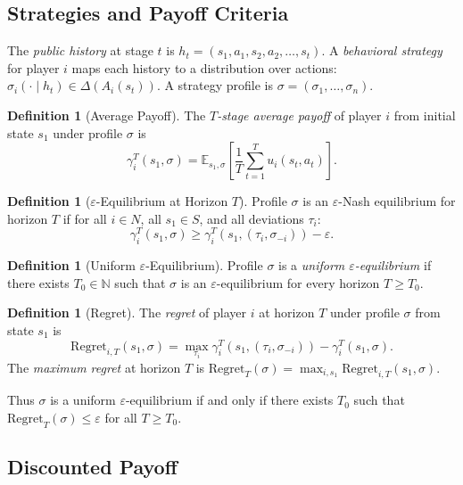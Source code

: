 \documentclass[11pt,a4paper]{article}
\theoremstyle{definition}
\newtheorem{definition}[theorem]{Definition}
\newcommand{\N}{\mathbb{N}}
\newcommand{\E}{\mathbb{E}}
\newcommand{\eps}{\varepsilon}
\newcommand{\Regret}{\mathrm{Regret}}
\begin{document}
\subsection{Strategies and Payoff Criteria}

The \emph{public history} at stage $t$ is $h_t = (s_1, a_1, s_2, a_2, \ldots, s_t)$.
A \emph{behavioral strategy} for player $i$ maps each history to a distribution over actions: $\sigma_i(\cdot \mid h_t) \in \Delta(A_i(s_t))$.
A strategy profile is $\sigma = (\sigma_1, \ldots, \sigma_n)$.

\begin{definition}[Average Payoff]
The \emph{$T$-stage average payoff} of player $i$ from initial state $s_1$ under profile $\sigma$ is
\[
\gamma_i^T(s_1, \sigma) = \E_{s_1, \sigma}\!\left[\frac{1}{T}\sum_{t=1}^{T} u_i(s_t, a_t)\right].
\]
\end{definition}

\begin{definition}[$\eps$-Equilibrium at Horizon $T$]
Profile $\sigma$ is an $\eps$-Nash equilibrium for horizon $T$ if for all $i \in N$, all $s_1 \in S$, and all deviations $\tau_i$:
\[
\gamma_i^T(s_1, \sigma) \geq \gamma_i^T(s_1, (\tau_i, \sigma_{-i})) - \eps.
\]
\end{definition}

\begin{definition}[Uniform $\eps$-Equilibrium]\label{def:uniform}
Profile $\sigma$ is a \emph{uniform $\eps$-equilibrium} if there exists $T_0 \in \N$ such that $\sigma$ is an $\eps$-equilibrium for every horizon $T \geq T_0$.
\end{definition}

\begin{definition}[Regret]
The \emph{regret} of player $i$ at horizon $T$ under profile $\sigma$ from state $s_1$ is
\[
\Regret_{i,T}(s_1, \sigma) = \max_{\tau_i} \gamma_i^T(s_1, (\tau_i, \sigma_{-i})) - \gamma_i^T(s_1, \sigma).
\]
The \emph{maximum regret} at horizon $T$ is $\Regret_T(\sigma) = \max_{i,s_1} \Regret_{i,T}(s_1, \sigma)$.
\end{definition}

Thus $\sigma$ is a uniform $\eps$-equilibrium if and only if there exists $T_0$ such that $\Regret_T(\sigma) \leq \eps$ for all $T \geq T_0$.

\subsection{Discounted Payoff}
\end{document}
